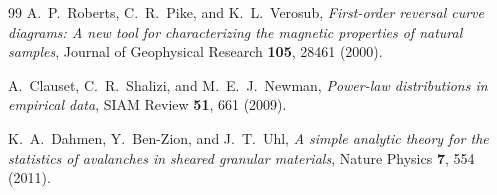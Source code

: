 \documentclass[11pt,a4paper]{article}
\begin{document}
\begin{thebibliography}{99}
A.~P.~Roberts, C.~R.~Pike, and K.~L.~Verosub,
\emph{First-order reversal curve diagrams: A new tool for characterizing the magnetic properties of natural samples},
Journal of Geophysical Research \textbf{105}, 28461 (2000).

A.~Clauset, C.~R.~Shalizi, and M.~E.~J.~Newman,
\emph{Power-law distributions in empirical data},
SIAM Review \textbf{51}, 661 (2009).

K.~A.~Dahmen, Y.~Ben-Zion, and J.~T.~Uhl,
\emph{A simple analytic theory for the statistics of avalanches in sheared granular materials},
Nature Physics \textbf{7}, 554 (2011).

\end{thebibliography}
\end{document}
